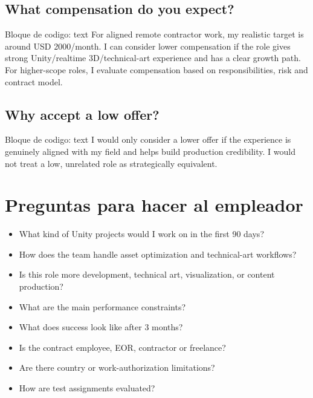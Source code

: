 \subsection{What compensation do you expect?}


\begin{mdcode}
Bloque de codigo: text
For aligned remote contractor work, my realistic target is around USD 2000/month. I can consider lower compensation if the role gives strong Unity/realtime 3D/technical-art experience and has a clear growth path. For higher-scope roles, I evaluate compensation based on responsibilities, risk and contract model.
\end{mdcode}


\subsection{Why accept a low offer?}


\begin{mdcode}
Bloque de codigo: text
I would only consider a lower offer if the experience is genuinely aligned with my field and helps build production credibility. I would not treat a low, unrelated role as strategically equivalent.
\end{mdcode}


\section{Preguntas para hacer al empleador}


\begin{itemize}
\item What kind of Unity projects would I work on in the first 90 days?
\item How does the team handle asset optimization and technical-art workflows?
\item Is this role more development, technical art, visualization, or content production?
\item What are the main performance constraints?
\item What does success look like after 3 months?
\item Is the contract employee, EOR, contractor or freelance?
\item Are there country or work-authorization limitations?
\item How are test assignments evaluated?
\end{itemize}
